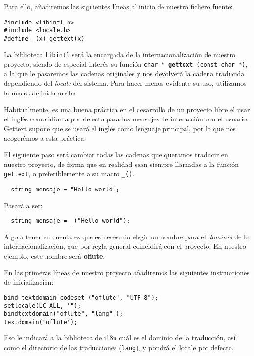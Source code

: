Para ello, añadiremos las siguientes líneas al inicio de nuestro fichero fuente:
\begin{verbatim}
#include <libintl.h>
#include <locale.h>
#define _(x) gettext(x)
\end{verbatim}

La biblioteca \texttt{libintl} será la encargada de la internacionalización de
nuestro proyecto, siendo de especial interés su función \texttt{char *
  \textbf{gettext} (const char *)}, a la que le pasaremos las cadenas originales
y nos devolverá la cadena traducida dependiendo del \textit{locale} del
sistema. Para hacer menos evidente su uso, utilizamos la macro definida arriba.

\begin{nota} Habitualmente, es una buena práctica en el desarrollo de un
  proyecto libre el usar el inglés como idioma por defecto para los mensajes de
  interacción con el usuario. Gettext supone que se usará el inglés como
  lenguaje principal, por lo que nos acogerémos a esta práctica.
\end{nota}

El siguiente paso será cambiar todas las cadenas que queramos traducir en
nuestro proyecto, de forma que en realidad sean siempre llamadas a la función
\texttt{gettext}, o preferiblemente a su macro \texttt{\_()}.
\begin{verbatim}
  string mensaje = "Hello world";
\end{verbatim}
Pasará a ser:
\begin{verbatim}
  string mensaje = _("Hello world");
\end{verbatim}

\medskip

Algo a tener en cuenta es que es necesario elegir un nombre para el
\textit{dominio} de la internacionalización, que por regla general coincidirá
con el proyecto. En nuestro ejemplo, este nombre será \textbf{oflute}.

\medskip

En las primeras líneas de nuestro proyecto añadiremos las siguientes
instrucciones de inicialización:

\begin{verbatim}
bind_textdomain_codeset ("oflute", "UTF-8");
setlocale(LC_ALL, "");
bindtextdomain("oflute", "lang" );
textdomain("oflute");
\end{verbatim}

Eso le indicará a la biblioteca de i18n cuál es el dominio de la
traducción, así como el directorio de las traducciones
(\texttt{lang}), y pondrá el locale por defecto.

